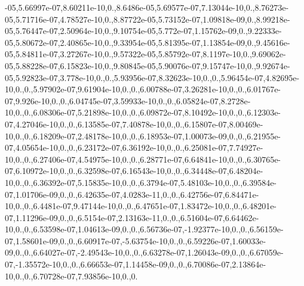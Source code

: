 \begin{DoxyCompactItemize}
-\/05,5.\-66997e-\/07,8.\-60211e-\/10,0.,8.\-6486e-\/05,5.\-69577e-\/07,7.\-13044e-\/10,0.,8.\-76273e-\/05,5.\-71716e-\/07,4.\-78527e-\/10,0.,8.\-87722e-\/05,5.\-73152e-\/07,1.\-09818e-\/09,0.,8.\-99218e-\/05,5.\-76447e-\/07,2.\-50964e-\/10,0.,9.\-10754e-\/05,5.\-772e-\/07,1.\-15762e-\/09,0.,9.\-22333e-\/05,5.\-80672e-\/07,2.\-40865e-\/10,0.,9.\-33954e-\/05,5.\-81395e-\/07,1.\-13854e-\/09,0.,9.\-45616e-\/05,5.\-84811e-\/07,3.\-27267e-\/10,0.,9.\-57322e-\/05,5.\-85792e-\/07,8.\-1197e-\/10,0.,9.\-69062e-\/05,5.\-88228e-\/07,6.\-15823e-\/10,0.,9.\-80845e-\/05,5.\-90076e-\/07,9.\-15747e-\/10,0.,9.\-92674e-\/05,5.\-92823e-\/07,3.\-778e-\/10,0.,0.,5.\-93956e-\/07,8.\-32623e-\/10,0.,0.,5.\-96454e-\/07,4.\-82695e-\/10,0.,0.,5.\-97902e-\/07,9.\-61904e-\/10,0.,0.,6.\-00788e-\/07,3.\-26281e-\/10,0.,0.,6.\-01767e-\/07,9.\-926e-\/10,0.,0.,6.\-04745e-\/07,3.\-59933e-\/10,0.,0.,6.\-05824e-\/07,8.\-2728e-\/10,0.,0.,6.\-08306e-\/07,5.\-21898e-\/10,0.,0.,6.\-09872e-\/07,8.\-10492e-\/10,0.,0.,6.\-12303e-\/07,4.\-27046e-\/10,0.,0.,6.\-13585e-\/07,7.\-40878e-\/10,0.,0.,6.\-15807e-\/07,8.\-00469e-\/10,0.,0.,6.\-18209e-\/07,2.\-48178e-\/10,0.,0.,6.\-18953e-\/07,1.\-00073e-\/09,0.,0.,6.\-21955e-\/07,4.\-05654e-\/10,0.,0.,6.\-23172e-\/07,6.\-36192e-\/10,0.,0.,6.\-25081e-\/07,7.\-74927e-\/10,0.,0.,6.\-27406e-\/07,4.\-54975e-\/10,0.,0.,6.\-28771e-\/07,6.\-64841e-\/10,0.,0.,6.\-30765e-\/07,6.\-10972e-\/10,0.,0.,6.\-32598e-\/07,6.\-16543e-\/10,0.,0.,6.\-34448e-\/07,6.\-48204e-\/10,0.,0.,6.\-36392e-\/07,5.\-15835e-\/10,0.,0.,6.\-3794e-\/07,5.\-48103e-\/10,0.,0.,6.\-39584e-\/07,1.\-01706e-\/09,0.,0.,6.\-42635e-\/07,4.\-0283e-\/11,0.,0.,6.\-42756e-\/07,6.\-84471e-\/10,0.,0.,6.\-4481e-\/07,9.\-47144e-\/10,0.,0.,6.\-47651e-\/07,1.\-83472e-\/10,0.,0.,6.\-48201e-\/07,1.\-11296e-\/09,0.,0.,6.\-5154e-\/07,2.\-13163e-\/11,0.,0.,6.\-51604e-\/07,6.\-64462e-\/10,0.,0.,6.\-53598e-\/07,1.\-04613e-\/09,0.,0.,6.\-56736e-\/07,-\/1.\-92377e-\/10,0.,0.,6.\-56159e-\/07,1.\-58601e-\/09,0.,0.,6.\-60917e-\/07,-\/5.\-63754e-\/10,0.,0.,6.\-59226e-\/07,1.\-60033e-\/09,0.,0.,6.\-64027e-\/07,-\/2.\-49543e-\/10,0.,0.,6.\-63278e-\/07,1.\-26043e-\/09,0.,0.,6.\-67059e-\/07,-\/1.\-35572e-\/10,0.,0.,6.\-66653e-\/07,1.\-14458e-\/09,0.,0.,6.\-70086e-\/07,2.\-13864e-\/10,0.,0.,6.\-70728e-\/07,7.\-93856e-\/10,0.,0.\
\end{DoxyCompactItemize}
